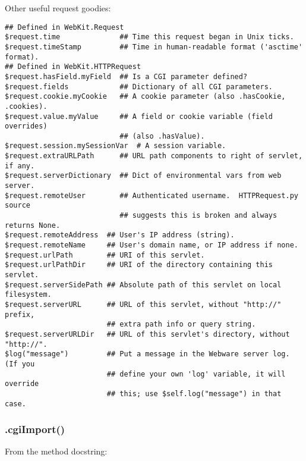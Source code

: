 Other useful request goodies:
\begin{verbatim}
## Defined in WebKit.Request
$request.time              ## Time this request began in Unix ticks.
$request.timeStamp         ## Time in human-readable format ('asctime' format).
## Defined in WebKit.HTTPRequest
$request.hasField.myField  ## Is a CGI parameter defined?
$request.fields            ## Dictionary of all CGI parameters.
$request.cookie.myCookie   ## A cookie parameter (also .hasCookie, .cookies).
$request.value.myValue     ## A field or cookie variable (field overrides)
                           ## (also .hasValue).
$request.session.mySessionVar  # A session variable.
$request.extraURLPath      ## URL path components to right of servlet, if any.
$request.serverDictionary  ## Dict of environmental vars from web server.
$request.remoteUser        ## Authenticated username.  HTTPRequest.py source
                           ## suggests this is broken and always returns None.
$request.remoteAddress  ## User's IP address (string).
$request.remoteName     ## User's domain name, or IP address if none.
$request.urlPath        ## URI of this servlet.
$request.urlPathDir     ## URI of the directory containing this servlet.
$request.serverSidePath ## Absolute path of this servlet on local filesystem.
$request.serverURL      ## URL of this servlet, without "http://" prefix,
                        ## extra path info or query string.
$request.serverURLDir   ## URL of this servlet's directory, without "http://".
$log("message")         ## Put a message in the Webware server log.  (If you
                        ## define your own 'log' variable, it will override
                        ## this; use $self.log("message") in that case.
\end{verbatim}

\subsubsection{.cgiImport()}
\label{webware.cgiImport}

From the method docstring:

